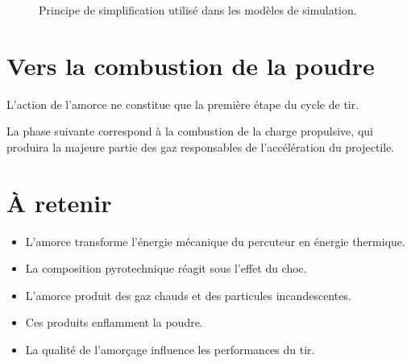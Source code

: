 \begin{figure}[htbp]
\centering


\caption{Principe de simplification utilisé dans les modèles de simulation.}
\label{fig:simulation_amorce}

\end{figure}

\section{Vers la combustion de la poudre}

L'action de l'amorce ne constitue que la première étape du cycle de tir.

La phase suivante correspond à la combustion de la charge propulsive, qui
produira la majeure partie des gaz responsables de l'accélération du
projectile.

\section{À retenir}

\begin{aretenir}

\begin{itemize}
    \item L'amorce transforme l'énergie mécanique du percuteur en énergie thermique.
    \item La composition pyrotechnique réagit sous l'effet du choc.
    \item L'amorce produit des gaz chauds et des particules incandescentes.
    \item Ces produits enflamment la poudre.
    \item La qualité de l'amorçage influence les performances du tir.
\end{itemize}

\end{aretenir}
